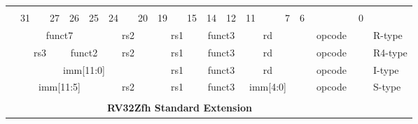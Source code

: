 \begin{table}[p]
\begin{small}
\begin{center}
    \begin{tabular} {p{0.002in}p{0.002in}p{0.002in}p{0.002in}p{0.002in}p{0.002in}p{0.002in}p{0.002in}p{0.002in}p{0.002in}p{0.002in}p{0.002in}p{0.002in}p{0.002in}p{0.002in}p{0.002in}p{0.002in}p{0.002in}p{0.002in}p{0.002in}p{0.002in}p{0.002in}p{0.002in}p{0.002in}p{0.002in}p{0.002in}p{0.002in}p{0.002in}p{0.002in}p{0.002in}p{0.002in}p{0.002in}p{0.002in}l}
    & & & & & & & & & & & & & & & & & & & & & & & & & & & & & & & & \\

            &

    \multicolumn{3}{l}{31} &
    \multicolumn{2}{r}{27} &
    \multicolumn{1}{c}{26} &
    \multicolumn{1}{r}{25} &
    \multicolumn{3}{l}{24} &
    \multicolumn{2}{r}{20} &
    \multicolumn{3}{l}{19} &
    \multicolumn{2}{r}{15} &
    \multicolumn{2}{l}{14} &
    \multicolumn{1}{r}{12} &
    \multicolumn{4}{l}{11} &
    \multicolumn{1}{r}{7} &
    \multicolumn{6}{l}{6} &
    \multicolumn{1}{r}{0} \\
    \cline{2-33}
&


\multicolumn{7}{|c|}{funct7} &
\multicolumn{5}{c|}{rs2} &
\multicolumn{5}{c|}{rs1} &
\multicolumn{3}{c|}{funct3} &
\multicolumn{5}{c|}{rd} &
\multicolumn{7}{|c|}{opcode} & R-type \\
\cline{2-33}
&

\multicolumn{5}{|c|}{rs3} &
\multicolumn{2}{c|}{funct2} &
\multicolumn{5}{c|}{rs2} &
\multicolumn{5}{c|}{rs1} &
\multicolumn{3}{c|}{funct3} &
\multicolumn{5}{c|}{rd} &
\multicolumn{7}{|c|}{opcode} & R4-type \\
\cline{2-33}
&

\multicolumn{12}{|c|}{imm[11:0]} &
\multicolumn{5}{c|}{rs1} &
\multicolumn{3}{c|}{funct3} &
\multicolumn{5}{c|}{rd} &
\multicolumn{7}{|c|}{opcode} & I-type \\
\cline{2-33}
&

\multicolumn{7}{|c|}{imm[11:5]} &
\multicolumn{5}{c|}{rs2} &
\multicolumn{5}{c|}{rs1} &
\multicolumn{3}{c|}{funct3} &
\multicolumn{5}{c|}{imm[4:0]} &
\multicolumn{7}{|c|}{opcode} & S-type \\
\cline{2-33}
&




\multicolumn{32}{c}{} & \\
\multicolumn{32}{c}{\bf RV32Zfh Standard Extension } & \\
\cline{2-33}


\end{tabular}
\end{center}
\end{small}
\end{table}
